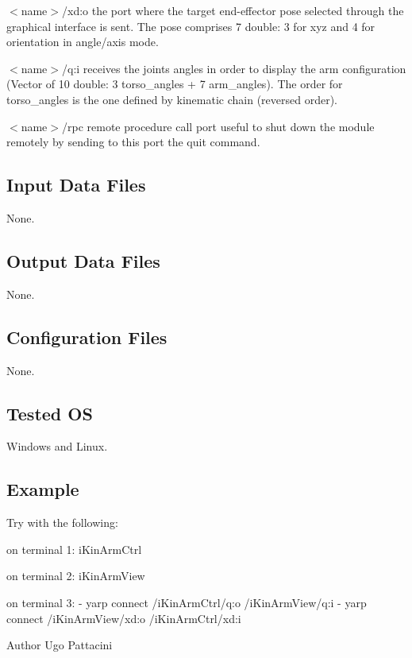 \begin{DoxyItemize}
\item {\itshape } $<$name$>$/xd\+:o the port where the target end-\/effector pose selected through the graphical interface is sent. The pose comprises 7 double\+: 3 for xyz and 4 for orientation in angle/axis mode.
\item {\itshape } $<$name$>$/q\+:i receives the joints angles in order to display the arm configuration (Vector of 10 double\+: 3 torso\+\_\+angles + 7 arm\+\_\+angles). The order for torso\+\_\+angles is the one defined by kinematic chain (reversed order).
\item {\itshape } $<$name$>$/rpc remote procedure call port useful to shut down the module remotely by sending to this port the \textquotesingle{}quit\textquotesingle{} command.
\end{DoxyItemize}\hypertarget{group__icub__signalScope_in_files_sec}{}\subsection{Input Data Files}\label{group__icub__signalScope_in_files_sec}
None.\hypertarget{group__icub__signalScope_out_data_sec}{}\subsection{Output Data Files}\label{group__icub__signalScope_out_data_sec}
None.\hypertarget{group__icub__signalScope_conf_file_sec}{}\subsection{Configuration Files}\label{group__icub__signalScope_conf_file_sec}
None.\hypertarget{group__icub__tld_tested_os_sec}{}\subsection{Tested O\+S}\label{group__icub__tld_tested_os_sec}
Windows and Linux.\hypertarget{group__icub__signalScope_example_sec}{}\subsection{Example}\label{group__icub__signalScope_example_sec}
Try with the following\+:


\begin{DoxyCode}
on terminal 1: iKinArmCtrl 
 
on terminal 2: iKinArmView 
 
on terminal 3: 
- yarp connect /iKinArmCtrl/q:o  /iKinArmView/q:i 
- yarp connect /iKinArmView/xd:o /iKinArmCtrl/xd:i 
\end{DoxyCode}


\begin{DoxyAuthor}{Author}
Ugo Pattacini 
\end{DoxyAuthor}
